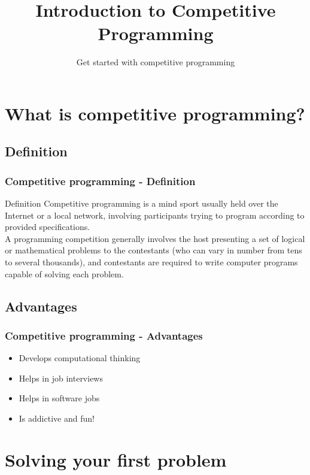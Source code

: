 
\title[Intro to CP]{Introduction to Competitive Programming}
\subtitle[Get started with CP]{Get started with competitive programming}



\section{What is competitive programming?}

\subsection{Definition}
\begin{frame}
    \frametitle{Competitive programming - Definition}
    \begin{alertblock}{Definition}
        Competitive programming is a mind sport usually held over the Internet or a local network, involving participants trying to program according to provided specifications. \\
        A programming competition generally involves the host presenting a set of logical or mathematical problems to the contestants (who can vary in number from tens to several thousands), and contestants are required to write computer programs capable of solving each problem. \\
    \end{alertblock}
\end{frame}

\subsection{Advantages}
\begin{frame}
    \frametitle{Competitive programming - Advantages}
    \begin{itemize}
        \item Develops \alert{computational thinking} \pause
        \item Helps in job interviews \pause
        \item Helps in software jobs \pause
        \item Is addictive and fun! 
    \end{itemize}
\end{frame}

\section{Solving your first problem}
